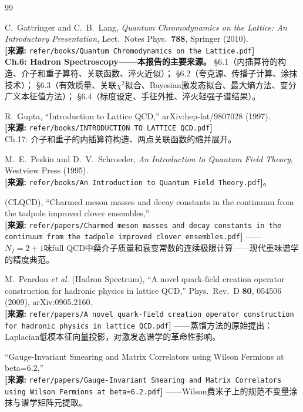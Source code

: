 \documentclass[12pt,a4paper]{ctexart}
\theoremstyle{definition}
\begin{document}
\begin{thebibliography}{99}

C.~Gattringer and C.~B.~Lang,
\textit{Quantum Chromodynamics on the Lattice: An Introductory Presentation},
Lect.\ Notes Phys.\ \textbf{788}, Springer (2010).
\\\textbf{[来源:} \texttt{refer/books/Quantum Chromodynamics on the Lattice.pdf}\textbf{]}
\\\textbf{Ch.6: Hadron Spectroscopy——本报告的主要来源。}
§6.1（内插算符的构造、介子和重子算符、关联函数、淬火近似）；
§6.2（夸克源、传播子计算、涂抹技术）；
§6.3（有效质量、关联$\chi^2$拟合、Bayesian激发态拟合、最大熵方法、变分广义本征值方法）；
§6.4（标度设定、手征外推、淬火轻强子谱结果）。

R.~Gupta,
``Introduction to Lattice QCD,''
arXiv:hep-lat/9807028 (1997).
\\\textbf{[来源:} \texttt{refer/books/INTRODUCTION TO LATTICE QCD.pdf}\textbf{]}
\\Ch.17: 介子和重子的内插算符构造、两点关联函数的缩并展开。

M.~E.~Peskin and D.~V.~Schroeder,
\textit{An Introduction to Quantum Field Theory}, Westview Press (1995).
\\\textbf{[来源:} \texttt{refer/books/An Introduction to Quantum Field Theory.pdf}\textbf{]}。

(CLQCD),
``Charmed meson masses and decay constants in the continuum from the tadpole improved clover ensembles,''
\\\textbf{[来源:} \texttt{refer/papers/Charmed meson masses and decay constants in the continuum from the tadpole improved clover ensembles.pdf}\textbf{]}
——$N_f=2+1$味full QCD中粲介子质量和衰变常数的连续极限计算——现代重味谱学的精度典范。

M.~Peardon \textit{et al.} (Hadron Spectrum),
``A novel quark-field creation operator construction for hadronic physics in lattice QCD,''
Phys.\ Rev.\ D \textbf{80}, 054506 (2009), arXiv:0905.2160.
\\\textbf{[来源:} \texttt{refer/papers/A novel quark-field creation operator construction for hadronic physics in lattice QCD.pdf}\textbf{]}
——蒸馏方法的原始提出：Laplacian低模本征向量投影，对激发态谱学的革命性影响。

``Gauge-Invariant Smearing and Matrix Correlators using Wilson Fermions at beta=6.2,''
\\\textbf{[来源:} \texttt{refer/papers/Gauge-Invariant Smearing and Matrix Correlators using Wilson Fermions at beta=6.2.pdf}\textbf{]}
——Wilson费米子上的规范不变量涂抹与谱学矩阵元提取。


\end{thebibliography}
\end{document}
